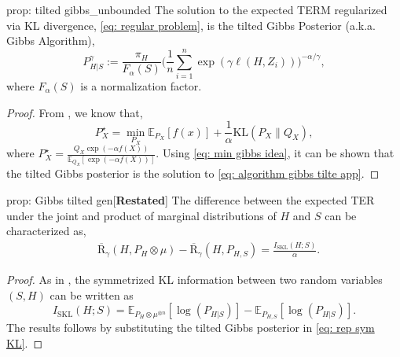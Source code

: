 \documentclass{article}
\theoremstyle{plain}
\theoremstyle{plain}
\theoremstyle{definition}
\theoremstyle{remark}
\newcommand{\RTT}{\overline{\mathrm{R}}_{\gamma}}
\newcommand{\KLr}{\mathrm{KL}}
\newcommand{\mbE}{\mathbb{E}}
\begin{document}
\begin{repproposition}{prop: tilted gibbs_unbounded}
    The solution to the expected TERM regularized via KL divergence, \eqref{eq: regular problem}, is the tilted Gibbs Posterior (a.k.a. Gibbs Algorithm),
    \begin{equation}
        P_{H|S}^{\gamma}:=\frac{\pi_H}{F_{\alpha}(S)} \Big(\frac{1}{n}\sum_{i=1}^n\exp(\gamma \ell(H,Z_i))\Big)^{-\alpha/\gamma},
    \end{equation}
    where $F_{\alpha}(S)$ is a normalization factor.
\end{repproposition}
\begin{proof}
    From \citep{zhang2006information}, we know that,
    \begin{equation}\label{eq: min gibbs idea}
    P_{X}^{\star}=\min_{P_X}\mbE_{P_X}[f(x)]+\frac{1}{\alpha}\KLr(P_X\|Q_X),
    \end{equation}
    where $P_X^{\star}=\frac{Q_X\exp(-\alpha f(X))}{\mbE_{Q_X}[\exp(-\alpha f(X))]}.$
Using \eqref{eq: min gibbs idea}, it can be shown that the tilted Gibbs posterior is the solution to \eqref{eq: algorithm gibbs tilte app}.

\end{proof}
 
\begin{tcolorbox}
      \begin{repproposition}{prop: Gibbs tilted gen}[\textbf{Restated}]
        The difference between the expected TER under the joint and product of marginal distributions of $H$ and $S$ can be characterized as,
        \begin{equation}
    \begin{split}
         &\RTT(H,P_{H}\otimes \mu)-\RTT(H,P_{H,S})=\frac{ I_{\mathrm{SKL}}(H;S)}{\alpha}.
    \end{split}
\end{equation}
    \end{repproposition}
    \end{tcolorbox}

\begin{proof}
    As in \citet{aminian2015capacity}, the symmetrized KL information between two random variables $(S,H)$  can be written as 
    \begin{equation}\label{eq: rep sym KL}I_{\mathrm{SKL}}(H;S)=\mbE_{P_{H}\otimes \mu^{\otimes n}}[\log(P_{H|S})]-\mbE_{P_{H,S}}[\log(P_{H|S})].\end{equation}
    The results follows by substituting the tilted Gibbs posterior in \eqref{eq: rep sym KL}.
\end{proof}
\end{document}
